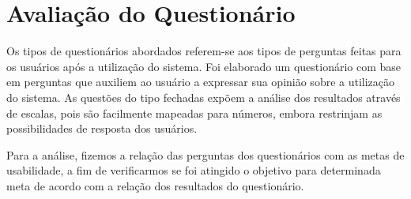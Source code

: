 \chapter[Avaliação do Questionário]{Avaliação do Questionário}

Os tipos de questionários abordados referem-se aos tipos de perguntas feitas para os usuários após a utilização do sistema.  Foi elaborado um questionário com base em perguntas que auxiliem ao usuário a expressar sua opinião sobre a utilização do sistema.
As questões do tipo fechadas expõem a análise dos resultados através de escalas, pois são facilmente mapeadas para números, embora restrinjam as possibilidades de resposta dos usuários. 

Para a análise, fizemos a relação das perguntas dos questionários com as metas de usabilidade, a fim de verificarmos se foi atingido o objetivo para determinada meta de acordo com a relação dos resultados do questionário.